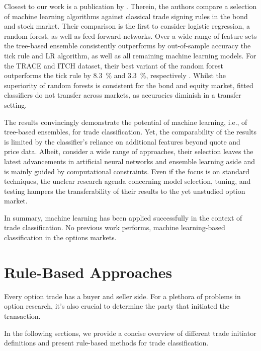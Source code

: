 Closest to our work is a publication by \textcite[1--58]{ronenMachineLearningTrade2022}. Therein, the authors compare a selection of machine learning algorithms against classical trade signing rules in the bond and stock market. Their comparison is the first to consider logistic regression, a random forest, as well as \glspl{feed-forward-network}. Over a wide range of feature sets the tree-based ensemble consistently outperforms by out-of-sample accuracy the tick rule and \gls{LR} algorithm, as well as all remaining machine learning models. For the \gls{TRACE} and ITCH dataset, their best variant of the random forest outperforms the tick rule by \SI{8.3}{\percent} and \SI{3.3}{\percent}, respectively \autocite[57]{ronenMachineLearningTrade2022}. Whilst the superiority of random forests is consistent for the bond and equity market, fitted classifiers do not transfer across markets, as accuracies diminish in a transfer setting.

The results convincingly demonstrate the potential of machine learning, i.e., of tree-based ensembles, for trade classification. Yet, the comparability of the results is limited by the classifier's reliance on additional features beyond quote and price data. Albeit, \textcite[13--14]{ronenMachineLearningTrade2022} consider a wide range of approaches, their selection leaves the latest advancements in artificial neural networks and ensemble learning aside and is mainly guided by computational constraints. Even if the focus is on standard techniques, the unclear research agenda concerning model selection, tuning, and testing hampers the transferability of their results to the yet unstudied option market.

In summary, machine learning has been applied successfully in the context of trade classification. No previous work performs, machine learning-based classification in the options markets.

\newpage
\section{Rule-Based Approaches}\label{sec:rule-based-approaches}

Every option trade has a buyer and seller side. For a plethora of problems in option research, it’s also crucial to determine the party that initiated the transaction.

In the following sections, we provide a concise overview of different trade initiator definitions and present rule-based methods for trade classification.


